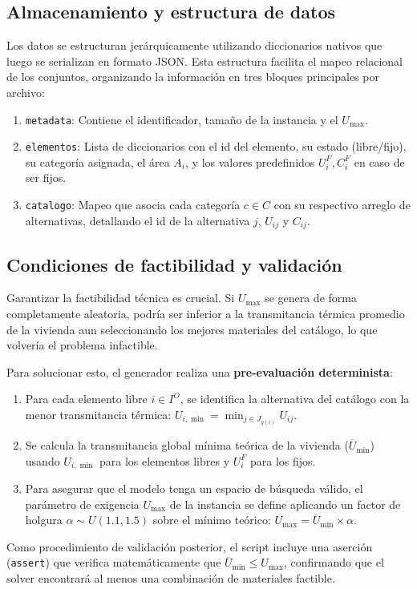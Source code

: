\documentclass[journal, 12pt, onecolumn]{IEEEtran}
\begin{document}
\subsection{Almacenamiento y estructura de datos}
Los datos se estructuran jerárquicamente utilizando diccionarios nativos que luego se serializan en formato JSON. Esta estructura facilita el mapeo relacional de los conjuntos, organizando la información en tres bloques principales por archivo:
\begin{enumerate}
    \item \texttt{metadata}: Contiene el identificador, tamaño de la instancia y el $U_{\max}$.
    \item \texttt{elementos}: Lista de diccionarios con el id del elemento, su estado (libre/fijo), su categoría asignada, el área $A_i$, y los valores predefinidos $U_i^F, C_i^F$ en caso de ser fijos.
    \item \texttt{catalogo}: Mapeo que asocia cada categoría $c \in C$ con su respectivo arreglo de alternativas, detallando el id de la alternativa $j$, $U_{ij}$ y $C_{ij}$.
\end{enumerate}

\subsection{Condiciones de factibilidad y validación}
Garantizar la factibilidad técnica es crucial. Si $U_{\max}$ se genera de forma completamente aleatoria, podría ser inferior a la transmitancia térmica promedio de la vivienda aun seleccionando los mejores materiales del catálogo, lo que volvería el problema infactible.

Para solucionar esto, el generador realiza una \textbf{pre-evaluación determinista}:
\begin{enumerate}
    \item Para cada elemento libre $i \in I^O$, se identifica la alternativa del catálogo con la menor transmitancia térmica: $U_{i, \min} = \min_{j \in J_{g(i)}} U_{ij}$.
    \item Se calcula la transmitancia global mínima teórica de la vivienda ($\overline{U}_{\min}$) usando $U_{i, \min}$ para los elementos libres y $U_i^F$ para los fijos.
    \item Para asegurar que el modelo tenga un espacio de búsqueda válido, el parámetro de exigencia $U_{\max}$ de la instancia se define aplicando un factor de holgura $\alpha \sim U(1.1, 1.5)$ sobre el mínimo teórico: $U_{\max} = \overline{U}_{\min} \times \alpha$.
\end{enumerate}
Como procedimiento de validación posterior, el script incluye una aserción (\texttt{assert}) que verifica matemáticamente que $\overline{U}_{\min} \leq U_{\max}$, confirmando que el solver encontrará al menos una combinación de materiales factible.
\end{document}
